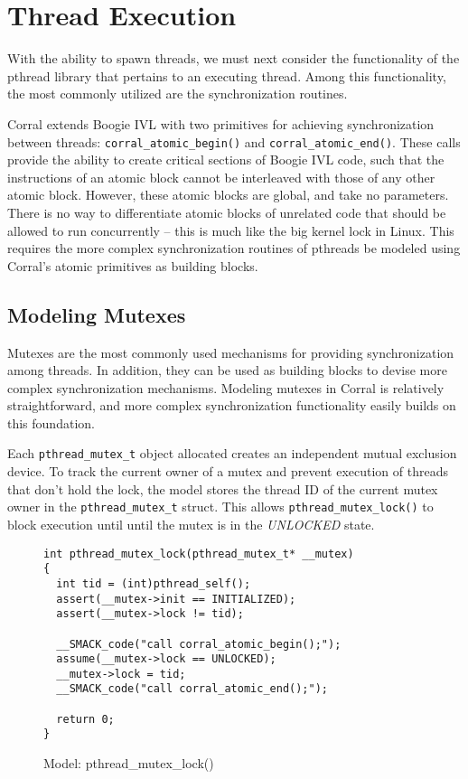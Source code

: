 \section{Thread Execution}
With the ability to spawn threads, we must next consider the
functionality of the pthread library that pertains to an executing
thread.  Among this functionality, the most commonly utilized are the
synchronization routines. 

Corral extends Boogie IVL with two primitives for achieving
synchronization between threads: \lstinline|corral_atomic_begin()| and
\lstinline|corral_atomic_end()|.  These calls provide the ability to
create critical sections of Boogie IVL code, such that the
instructions of an atomic block cannot be interleaved with those of
any other atomic block.  However, these atomic blocks are global, and
take no parameters.  There is no way to differentiate atomic blocks of
unrelated code that should be allowed to run concurrently -- this is
much like the big kernel lock in Linux.  This requires the more
complex synchronization routines of pthreads be modeled using
Corral's atomic primitives as building blocks.  

\subsection{Modeling Mutexes}
Mutexes are the most commonly used mechanisms for providing
synchronization among threads.  In addition, they can be used as
building blocks to devise more complex synchronization mechanisms.
Modeling mutexes in Corral is relatively straightforward, and more
complex synchronization functionality easily builds on this
foundation. 

Each \lstinline|pthread_mutex_t| object allocated creates an
independent mutual exclusion device.  To track the current owner of a
mutex and prevent execution of threads that don't hold the lock, the
model stores the thread ID of the current mutex owner in the
\lstinline|pthread_mutex_t| struct.  This allows
\lstinline|pthread_mutex_lock()| to block execution until until the
mutex is in the \emph{UNLOCKED} state.


\begin{figure}[h]
\centering
\caption{Model: pthread\_mutex\_lock()}\label{fig:pthread_mutex_lock}
\begin{lstlisting}
int pthread_mutex_lock(pthread_mutex_t* __mutex)
{
  int tid = (int)pthread_self();
  assert(__mutex->init == INITIALIZED);
  assert(__mutex->lock != tid);

  __SMACK_code("call corral_atomic_begin();");
  assume(__mutex->lock == UNLOCKED);
  __mutex->lock = tid;
  __SMACK_code("call corral_atomic_end();");

  return 0;
}
\end{lstlisting}
\end{figure}

